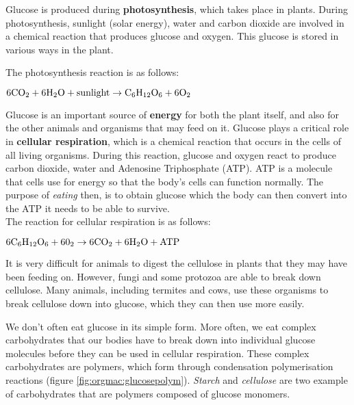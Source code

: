 Glucose is produced during \textbf{photosynthesis}, which takes place in plants. During photosynthesis, sunlight (solar energy), water and carbon dioxide are involved in a chemical reaction that produces glucose and oxygen. This glucose is stored in various ways in the plant. 

The photosynthesis reaction is as follows:

\begin{center}
$\rm{6CO_{2} + 6H_{2}O + sunlight \rightarrow C_{6}H_{12}O_{6} + 6O_{2}}$\\
\end{center}

Glucose is an important source of \textbf{energy} for both the plant itself, and also for the other animals and organisms that may feed on it. Glucose plays a critical role in \textbf{cellular respiration}, which is a chemical reaction that occurs in the cells of all living organisms. During this reaction, glucose and oxygen react to produce carbon dioxide, water and Adenosine Triphosphate (ATP). ATP is a molecule that cells use for energy so that the body's cells can function normally. The purpose of \textit{eating} then, is to obtain glucose which the body can then convert into the ATP it needs to be able to survive.\\

The reaction for cellular respiration is as follows:

\begin{center}
$\rm{6C_{6}H_{12}O_{6} + 60_{2} \rightarrow 6CO_{2} + 6H_{2}O + ATP}$\\
\end{center}


\begin{IFact}
{
It is very difficult for animals to digest the cellulose in plants that they may have been feeding on. However, fungi and some protozoa are able to break down cellulose. Many animals, including termites and cows, use these organisms to break cellulose down into glucose, which they can then use more easily.
}
\end{IFact}
We don't often eat glucose in its simple form. More often, we eat complex carbohydrates that our bodies have to break down into individual glucose molecules before they can be used in cellular respiration. These complex carbohydrates are polymers, which form through condensation polymerisation reactions (figure \ref{fig:orgmac:glucosepolym}). \textit{Starch} and \textit{cellulose} are two example of carbohydrates that are polymers composed of glucose monomers. 

